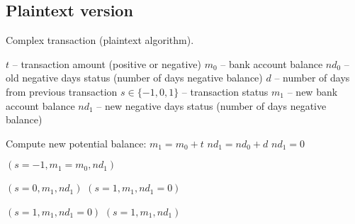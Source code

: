 \documentclass{article}
\begin{document}
\subsection{Plaintext version}



\begin{algorithm}
\caption{Complex transaction (plaintext algorithm).}
\begin{algorithmic}[1]
    \Require $t$ -- transaction amount (positive or negative)
    \Require $m_0$ -- bank account balance
    \Require $nd_0$ -- old negative days status (number of days negative balance)
    \Require $d$ -- number of days from previous transaction
    \Ensure $s \in \{-1, 0, 1\}$ -- transaction status
    \Ensure $m_1$ -- new bank account balance
    \Ensure $nd_1$ -- new negative days status (number of days negative balance)
    
    \Statex
    
    \State Compute new potential balance: $m_1 = m_0 + t$ \label{algline:new_balance}
     \label{algline:new_negative_status} 
        \State $nd_1 = nd_0 + d$ 
    \Else
        \State $nd_1 = 0$
    \EndIf
    
    \Statex
    
      \label{algline:pay}
            \State \Return $(s = -1, m_1 = m_0, nd_1)$ \label{algline:pay-1}
            
         
            \State \Return $(s = 0, m_1, nd_1)$ \label{algline:pay0}
        \Else {}
            \State \Return $(s = 1, m_1, nd_1 = 0)$ \label{algline:pay1}
        \EndIf

    \Else {} \label{algline:receive}
        	\State \Return $(s = 1, m_1, nd_1 = 0)$ \label{algline:receive_positive}
        \Else
            \State \Return $(s = 1, m_1, nd_1)$ \label{algline:receive_negative}
        \EndIf
    \EndIf
    
\end{algorithmic}\label{alg:transactionSenderIdeaClear}
\end{algorithm}
\end{document}
